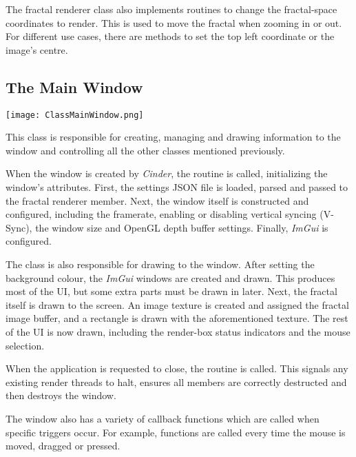 \vspace{0.5cm}

The fractal renderer class also implements routines to change the fractal-space coordinates to render. This is used to move the fractal when zooming in or out. For different use cases, there are methods to set the top left coordinate or the image's centre.

\subsection{The Main Window}

\FloatBarrier
\begin{figure*}[htp]
    \centering
    \texttt{[image: ClassMainWindow.png]}
\end{figure*}
\FloatBarrier

This class is responsible for creating, managing and drawing information to the window and controlling all the other classes mentioned previously.

\vspace{0.5cm}
\noindent
When the window is created by \textit{Cinder}, the  routine is called, initializing the window's attributes. First, the settings JSON file is loaded, parsed and passed to the fractal renderer member. Next, the window itself is constructed and configured, including the framerate, enabling or disabling vertical syncing (V-Sync), the window size and OpenGL depth buffer settings. Finally, \textit{ImGui} is configured.

The  class is also responsible for drawing to the window. After setting the background colour, the \textit{ImGui} windows are created and drawn. This produces most of the UI, but some extra parts must be drawn in later. Next, the fractal itself is drawn to the screen. An image texture is created and assigned the fractal image buffer, and a rectangle is drawn with the aforementioned texture. The rest of the UI is now drawn, including the render-box status indicators and the mouse selection.

When the application is requested to close, the  routine is called. This signals any existing render threads to halt, ensures all members are correctly destructed and then destroys the window.

The window also has a variety of callback functions which are called when specific triggers occur. For example, functions are called every time the mouse is moved, dragged or pressed.


